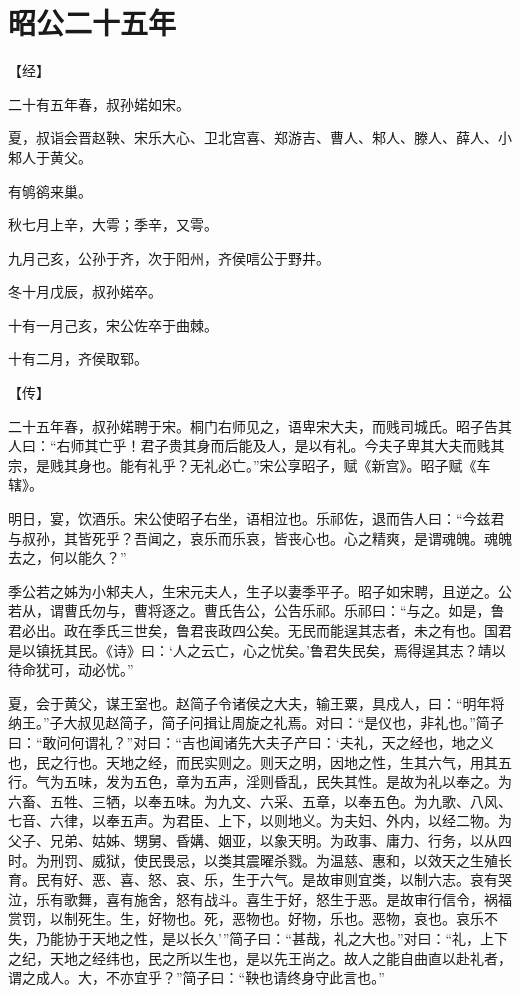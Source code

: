 \documentclass[a4paper,12pt,UTF8,twoside]{ctexbook}
\begin{document}
\section{昭公二十五年}



【经】

二十有五年春，叔孙婼如宋。

夏，叔诣会晋赵鞅、宋乐大心、卫北宫喜、郑游吉、曹人、邾人、滕人、薛人、小邾人于黄父。

有鸲鹆来巢。

秋七月上辛，大雩；季辛，又雩。

九月己亥，公孙于齐，次于阳州，齐侯唁公于野井。

冬十月戊辰，叔孙婼卒。

十有一月己亥，宋公佐卒于曲棘。

十有二月，齐侯取郓。

【传】

二十五年春，叔孙婼聘于宋。桐门右师见之，语卑宋大夫，而贱司城氏。昭子告其人曰：“右师其亡乎！君子贵其身而后能及人，是以有礼。今夫子卑其大夫而贱其宗，是贱其身也。能有礼乎？无礼必亡。”宋公享昭子，赋《新宫》。昭子赋《车辖》。

明日，宴，饮酒乐。宋公使昭子右坐，语相泣也。乐祁佐，退而告人曰：“今兹君与叔孙，其皆死乎？吾闻之，哀乐而乐哀，皆丧心也。心之精爽，是谓魂魄。魂魄去之，何以能久？”

季公若之姊为小邾夫人，生宋元夫人，生子以妻季平子。昭子如宋聘，且逆之。公若从，谓曹氏勿与，曹将逐之。曹氏告公，公告乐祁。乐祁曰：“与之。如是，鲁君必出。政在季氏三世矣，鲁君丧政四公矣。无民而能逞其志者，未之有也。国君是以镇抚其民。《诗》曰：‘人之云亡，心之忧矣。’鲁君失民矣，焉得逞其志？靖以待命犹可，动必忧。”

夏，会于黄父，谋王室也。赵简子令诸侯之大夫，输王粟，具戍人，曰：“明年将纳王。”子大叔见赵简子，简子问揖让周旋之礼焉。对曰：“是仪也，非礼也。”简子曰：“敢问何谓礼？”对曰：“吉也闻诸先大夫子产曰：‘夫礼，天之经也，地之义也，民之行也。天地之经，而民实则之。则天之明，因地之性，生其六气，用其五行。气为五味，发为五色，章为五声，淫则昏乱，民失其性。是故为礼以奉之。为六畜、五牲、三牺，以奉五味。为九文、六采、五章，以奉五色。为九歌、八风、七音、六律，以奉五声。为君臣、上下，以则地义。为夫妇、外内，以经二物。为父子、兄弟、姑姊、甥舅、昏媾、姻亚，以象天明。为政事、庸力、行务，以从四时。为刑罚、威狱，使民畏忌，以类其震曜杀戮。为温慈、惠和，以效天之生殖长育。民有好、恶、喜、怒、哀、乐，生于六气。是故审则宜类，以制六志。哀有哭泣，乐有歌舞，喜有施舍，怒有战斗。喜生于好，怒生于恶。是故审行信令，祸福赏罚，以制死生。生，好物也。死，恶物也。好物，乐也。恶物，哀也。哀乐不失，乃能协于天地之性，是以长久’”简子曰：“甚哉，礼之大也。”对曰：“礼，上下之纪，天地之经纬也，民之所以生也，是以先王尚之。故人之能自曲直以赴礼者，谓之成人。大，不亦宜乎？”简子曰：“鞅也请终身守此言也。”
\end{document}
